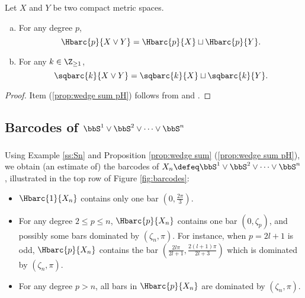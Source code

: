 \begin{proposition}\label{prop:wedge sum}
	Let $X$ and $Y$ be two compact metric spaces.
	\begin{enumerate}[(a)]
		\item\label{prop:wedge sum pH} For any degree $p$,
		\begin{equation*}\label{eq:wedge sum pH}
			\Hbarc{p}{X\vee Y}= \Hbarc{p}{X}\sqcup \Hbarc{p}{Y}.
		\end{equation*}
		\item\label{prop:wedge sum Sq} For any $k\in \Z_{\geq 1}$,
		\begin{equation*}\label{eq:wedge sum Sq}
			\sqbarc{k}{X\vee Y}= \sqbarc{k}{X}\sqcup \sqbarc{k}{Y}.
		\end{equation*}
	\end{enumerate}
\end{proposition}

\begin{proof}
	Item (\ref{prop:wedge sum pH}) follows from \cite[Proposition 3.7]{adamaszek2020homotopy} and \cite[Thoerem 9 (2)]{lim2020vietoris}.

\end{proof}

\subsection{Barcodes of $\bbS^1 \vee \bbS^2 \vee \dots \vee \bbS^n$}

\subsubsection{} Using Example \ref{ss:Sn} and Proposition \ref{prop:wedge sum} (\ref{prop:wedge sum pH}), we obtain (an estimate of) the barcodes of $X_n\defeq \bbS^1\vee\bbS^2\vee\dots\vee\bbS^n$, illustrated in the top row of Figure \ref{fig:barcodes}:
\begin{itemize}
	\item $\Hbarc{1}{X_n}$ contains only one bar $\left(0,\frac{2\pi}{3}\right)$.
	\item For any degree $2\leq p\leq n$, $\Hbarc{p}{X_n}$ contains one bar $(0,\zeta_p)$, and possibly some bars dominated by $(\zeta_n,\pi)$. For instance, when $p=2l+1$ is odd, $\Hbarc{p}{X_n}$ contains the bar $( \frac{2l\pi}{2l+1},\frac{2(l+1)\pi}{2l+3})$ which is dominated by $(\zeta_n,\pi)$.
	\item For any degree $p>n$, all bars in $\Hbarc{p}{X_n}$ are dominated by $(\zeta_n,\pi)$.
\end{itemize}

